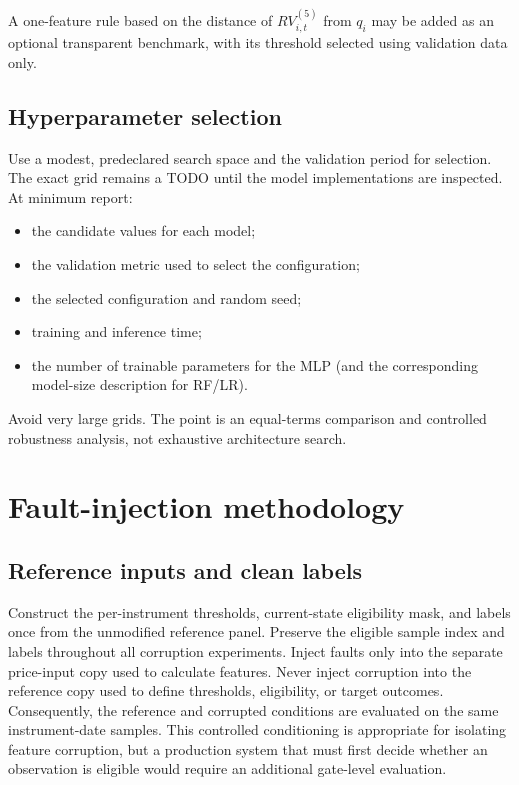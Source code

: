 \documentclass[11pt,a4paper]{article}
\begin{document}
A one-feature rule based on the distance of $RV_{i,t}^{(5)}$ from $q_i$ may be added as an optional transparent benchmark, with its threshold selected using validation data only.

\subsection{Hyperparameter selection}

Use a modest, predeclared search space and the validation period for selection. The exact grid remains a TODO until the model implementations are inspected. At minimum report:
\begin{itemize}
  \item the candidate values for each model;
  \item the validation metric used to select the configuration;
  \item the selected configuration and random seed;
  \item training and inference time;
  \item the number of trainable parameters for the MLP (and the corresponding model-size description for RF/LR).
\end{itemize}

Avoid very large grids. The point is an equal-terms comparison and controlled robustness analysis, not exhaustive architecture search.

\section{Fault-injection methodology}
\label{sec:faults}

\subsection{Reference inputs and clean labels}

Construct the per-instrument thresholds, current-state eligibility mask, and labels once from the unmodified reference panel. Preserve the eligible sample index and labels throughout all corruption experiments. Inject faults only into the separate price-input copy used to calculate features. Never inject corruption into the reference copy used to define thresholds, eligibility, or target outcomes. Consequently, the reference and corrupted conditions are evaluated on the same instrument-date samples. This controlled conditioning is appropriate for isolating feature corruption, but a production system that must first decide whether an observation is eligible would require an additional gate-level evaluation.
\end{document}
